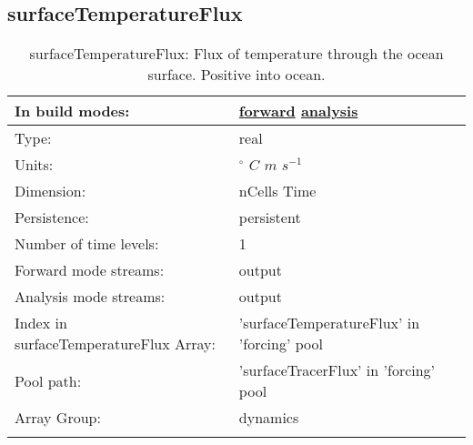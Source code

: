 \subsection[surfaceTemperatureFlux]{surfaceTemperatureFlux}
\label{subsec:var_sec_forcing_surfaceTemperatureFlux}
\begin{center}
\begin{longtable}{| p{2.0in} | p{4.0in} |}
        \hline 
        In build modes: & \hyperref[subsec:forward_var_tab_forcing]{forward} \hyperref[subsec:analysis_var_tab_forcing]{analysis} \\
        \hline 
        Type: & real \\
        \hline 
        Units: & $^\circ$ $C$ $m$ $s^{-1}$ \\
        \hline 
        Dimension: & nCells Time \\
        \hline 
        Persistence: & persistent \\
        \hline 
        Number of time levels: & 1 \\
        \hline 
		 Forward mode streams: &  output \\
        \hline 
		 Analysis mode streams: &  output \\
        \hline 
		 Index in surfaceTemperatureFlux Array: & 'surfaceTemperatureFlux' in 'forcing' pool \\
		 \hline 
            Pool path: & 'surfaceTracerFlux' in 'forcing' pool
 \\
		 \hline 
		 Array Group: & dynamics \\
		 \hline 
    \caption{surfaceTemperatureFlux: Flux of temperature through the ocean surface. Positive into ocean.}
\end{longtable}
\end{center}
